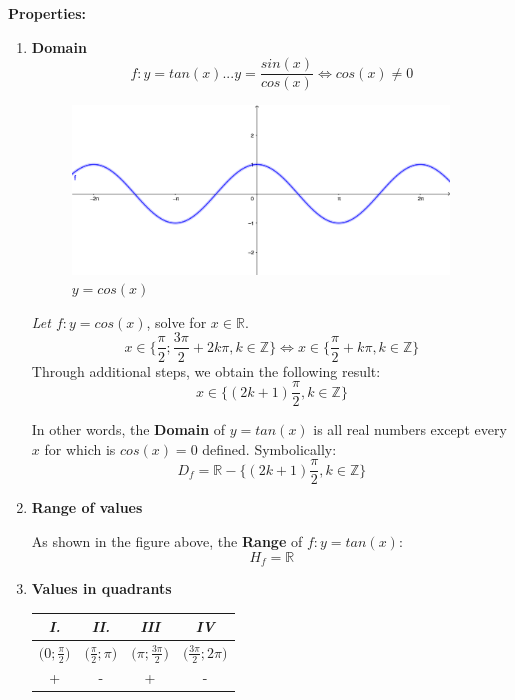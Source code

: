 \documentclass{article}
\begin{document}
\textbf{Properties: }
\begin{enumerate}

    \item \textbf{Domain}
    \[
    f:y=tan(x) ... y=\frac{sin(x)}{cos(x)} \Leftrightarrow cos(x) \neq 0
    \]
    
    \begin{figure}[htp]
        \centering
        \includegraphics[width=10cm]{cosine.png}
        \caption{$y=cos(x)$}
    \end{figure}    
    
    \textit{Let $f:y=cos(x)$}, solve for $x\in\mathbb{R}$.
    \[
    x \in \Big\{ \frac{\pi}{2}; \frac{3\pi}{2} + 2k\pi, k \in\mathbb{Z} \Big\} \Leftrightarrow
    x \in \Big\{ \frac{\pi}{2} + k\pi, k \in\mathbb{Z} \Big\}
    \]
    Through additional steps, we obtain the following result:
    \[
    x\in\{(2k+1)\frac{\pi}{2}, k\in\mathbb{Z} \}
    \]
    
    In other words, the \textbf{Domain} of $y=tan(x)$ is all real numbers except every $x$ for which is $cos(x) = 0$ defined. Symbolically:
    \[
    D_f= \mathbb{R}-\{ (2k+1)\frac{\pi}{2}, k\in\mathbb{Z} \}
    \]
    
    \item \textbf{Range of values}
    
    As shown in the figure above, the \textbf{Range} of $f: y=tan(x)$:
    \[
    H_f=\mathbb{R}
    \]
    
    \item \textbf{Values in quadrants}
    
    \begin{center}
    \begin{tabular}{||c c c c||} 
    \hline
    \textit{I.} & \textit{II.} & \textit{III} & \textit{IV} \\ [0.5ex] 
    \hline\hline
    $\Big(0;\frac{\pi}{2}\Big)$ & $\Big(\frac{\pi}{2};\pi\Big)$ & $\Big(\pi;\frac{3\pi}{2}\Big)$ & 
    $\Big(\frac{3\pi}{2};2\pi\Big)$ \\
    \hline
    + & - & + & - \\ [1ex] 
    \hline
    \end{tabular}
    \end{center}
    

\end{enumerate}
\end{document}
